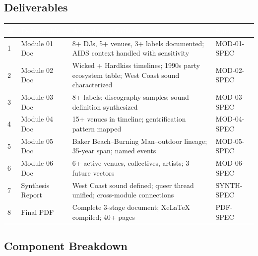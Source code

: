 \documentclass[11pt,letterpaper]{article}
\newcommand{\tableheader}[1]{\textbf{\sffamily\textcolor{white}{#1}}}
\begin{document}
\subsection{Deliverables}

\begin{center}
\begin{tabularx}{\textwidth}{C{0.5cm}L{4cm}XL{2.5cm}}
\toprule
{}
\tableheader{\#} & \tableheader{Deliverable} & \tableheader{Acceptance Criteria} & \tableheader{Spec} \\
 & Module 01 Doc & 8+ DJs, 5+ venues, 3+ labels documented; AIDS context handled with sensitivity & MOD-01-SPEC \\
2 & Module 02 Doc & Wicked + Hardkiss timelines; 1990s party ecosystem table; West Coast sound characterized & MOD-02-SPEC \\
3 & Module 03 Doc & 8+ labels; discography samples; sound definition synthesized & MOD-03-SPEC \\
4 & Module 04 Doc & 15+ venues in timeline; gentrification pattern mapped & MOD-04-SPEC \\
5 & Module 05 Doc & Baker Beach–Burning Man–outdoor lineage; 35-year span; named events & MOD-05-SPEC \\
6 & Module 06 Doc & 6+ active venues, collectives, artists; 3 future vectors & MOD-06-SPEC \\
7 & Synthesis Report & West Coast sound defined; queer thread unified; cross-module connections & SYNTH-SPEC \\
8 & Final PDF & Complete 3-stage document; XeLaTeX compiled; 40+ pages & PDF-SPEC \\
\bottomrule
\end{tabularx}
\end{center}

\subsection{Component Breakdown}
\end{document}
